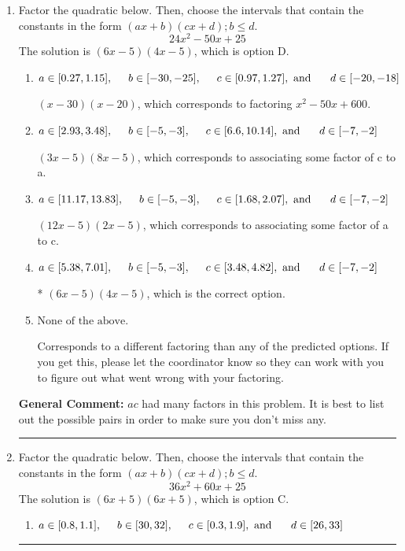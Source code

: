 \documentclass{extbook}[14pt]
\newcommand{\litem}[1]{\item #1

\rule{\textwidth}{0.4pt}}
\begin{document}
\begin{enumerate}\litem{
Factor the quadratic below. Then, choose the intervals that contain the constants in the form $(ax+b)(cx+d); b \leq d.$
\[ 24x^{2} -50 x + 25 \]The solution is \( (6x -5)(4x -5) \), which is option D.\begin{enumerate}[label=\Alph*.]
\item \( a \in [0.27, 1.15], \hspace*{5mm} b \in [-30, -25], \hspace*{5mm} c \in [0.97, 1.27], \text{ and } \hspace*{5mm} d \in [-20, -18] \)

 $(x -30)(x -20)$, which corresponds to factoring $x^{2} -50 x + 600$.
\item \( a \in [2.93, 3.48], \hspace*{5mm} b \in [-5, -3], \hspace*{5mm} c \in [6.6, 10.14], \text{ and } \hspace*{5mm} d \in [-7, -2] \)

 $(3x -5)(8x -5)$, which corresponds to associating some factor of c to a.
\item \( a \in [11.17, 13.83], \hspace*{5mm} b \in [-5, -3], \hspace*{5mm} c \in [1.68, 2.07], \text{ and } \hspace*{5mm} d \in [-7, -2] \)

 $(12x -5)(2x -5)$, which corresponds to associating some factor of a to c.
\item \( a \in [5.38, 7.01], \hspace*{5mm} b \in [-5, -3], \hspace*{5mm} c \in [3.48, 4.82], \text{ and } \hspace*{5mm} d \in [-7, -2] \)

* $(6x -5)(4x -5)$, which is the correct option.
\item \( \text{None of the above.} \)

 Corresponds to a different factoring than any of the predicted options. If you get this, please let the coordinator know so they can work with you to figure out what went wrong with your factoring.
\end{enumerate}

\textbf{General Comment:} $ac$ had many factors in this problem. It is best to list out the possible pairs in order to make sure you don't miss any.
}
\litem{
Factor the quadratic below. Then, choose the intervals that contain the constants in the form $(ax+b)(cx+d); b \leq d.$
\[ 36x^{2} +60 x + 25 \]The solution is \( (6x + 5)(6x + 5) \), which is option C.\begin{enumerate}[label=\Alph*.]
\item \( a \in [0.8, 1.1], \hspace*{5mm} b \in [30, 32], \hspace*{5mm} c \in [0.3, 1.9], \text{ and } \hspace*{5mm} d \in [26, 33] \)


\end{enumerate}}
\end{enumerate}
\end{document}
